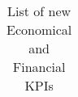 \begin{table}[H]
\begin{tabular}{|l|l|l|l|}
\end{tabular}
\caption{List of new Economical and Financial KPIs}
\label{tab:economic}
\end{table}
